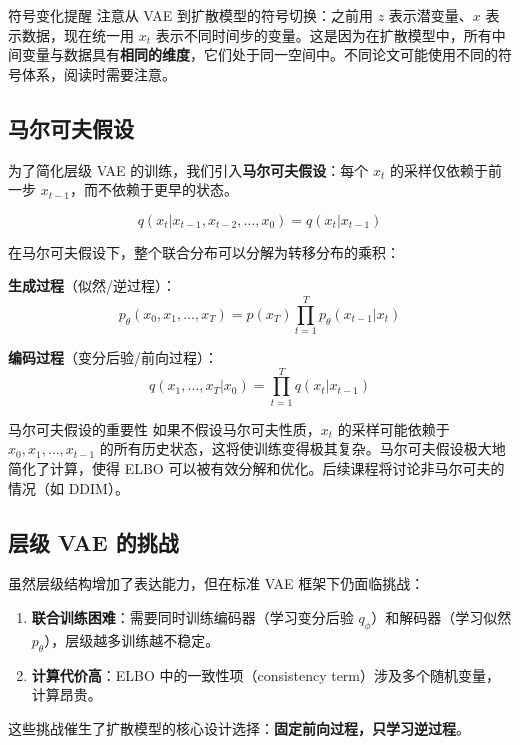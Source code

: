 \documentclass[a4paper]{article}
\begin{document}
\begin{warningbox}{符号变化提醒}
注意从 VAE 到扩散模型的符号切换：之前用 $z$ 表示潜变量、$x$ 表示数据，现在统一用 $x_t$ 表示不同时间步的变量。这是因为在扩散模型中，所有中间变量与数据具有\textbf{相同的维度}，它们处于同一空间中。不同论文可能使用不同的符号体系，阅读时需要注意。
\end{warningbox}

\subsection{马尔可夫假设}

为了简化层级 VAE 的训练，我们引入\textbf{马尔可夫假设}：每个 $x_t$ 的采样仅依赖于前一步 $x_{t-1}$，而不依赖于更早的状态。

$$q(x_t | x_{t-1}, x_{t-2}, \ldots, x_0) = q(x_t | x_{t-1})$$

在马尔可夫假设下，整个联合分布可以分解为转移分布的乘积：

\textbf{生成过程}（似然/逆过程）：
$$p_\theta(x_0, x_1, \ldots, x_T) = p(x_T) \prod_{t=1}^{T} p_\theta(x_{t-1} | x_t)$$

\textbf{编码过程}（变分后验/前向过程）：
$$q(x_1, \ldots, x_T | x_0) = \prod_{t=1}^{T} q(x_t | x_{t-1})$$

\begin{importantbox}{马尔可夫假设的重要性}
如果不假设马尔可夫性质，$x_t$ 的采样可能依赖于 $x_0, x_1, \ldots, x_{t-1}$ 的所有历史状态，这将使训练变得极其复杂。马尔可夫假设极大地简化了计算，使得 ELBO 可以被有效分解和优化。后续课程将讨论非马尔可夫的情况（如 DDIM）。
\end{importantbox}

\subsection{层级 VAE 的挑战}

虽然层级结构增加了表达能力，但在标准 VAE 框架下仍面临挑战：

\begin{enumerate}
    \item \textbf{联合训练困难}：需要同时训练编码器（学习变分后验 $q_\phi$）和解码器（学习似然 $p_\theta$），层级越多训练越不稳定。
    \item \textbf{计算代价高}：ELBO 中的一致性项（consistency term）涉及多个随机变量，计算昂贵。
\end{enumerate}

这些挑战催生了扩散模型的核心设计选择：\textbf{固定前向过程，只学习逆过程}。
\end{document}
